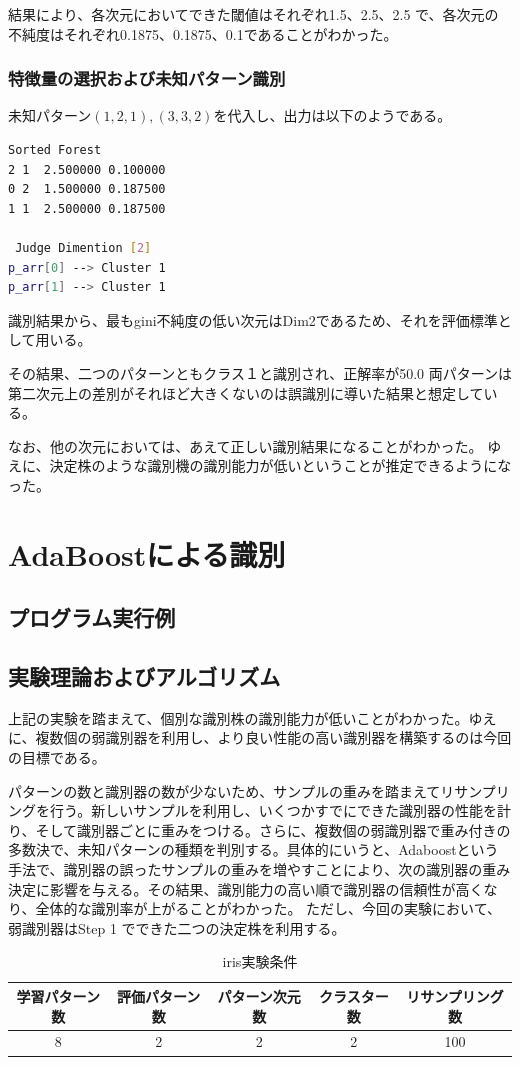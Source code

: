 \documentclass[ %
  uplatex,%
  papersize%
]{jsarticle}
\begin{document}
結果により、各次元においてできた閾値はそれぞれ1.5、2.5、2.5 で、各次元の不純度はそれぞれ0.1875、0.1875、0.1であることがわかった。

\subsubsection{特徴量の選択および未知パターン識別}
未知パターン$(1, 2, 1),(3, 3, 2)$を代入し、出力は以下のようである。

\begin{lstlisting}[language=bash,caption=Recognition]
Sorted Forest
2 1  2.500000 0.100000
0 2  1.500000 0.187500
1 1  2.500000 0.187500

 Judge Dimention [2]
p_arr[0] --> Cluster 1
p_arr[1] --> Cluster 1
\end{lstlisting}

識別結果から、最もgini不純度の低い次元はDim2であるため、それを評価標準として用いる。

その結果、二つのパターンともクラス１と識別され、正解率が50.0%
両パターンは第二次元上の差別がそれほど大きくないのは誤識別に導いた結果と想定している。

なお、他の次元においては、あえて正しい識別結果になることがわかった。
ゆえに、決定株のような識別機の識別能力が低いということが推定できるようになった。

\section{AdaBoostによる識別}

\subsection{プログラム実行例}

\subsection{実験理論およびアルゴリズム}

上記の実験を踏まえて、個別な識別株の識別能力が低いことがわかった。ゆえに、複数個の弱識別器を利用し、より良い性能の高い識別器を構築するのは今回の目標である。

パターンの数と識別器の数が少ないため、サンプルの重みを踏まえてリサンプリングを行う。新しいサンプルを利用し、いくつかすでにできた識別器の性能を計り、そして識別器ごとに重みをつける。さらに、複数個の弱識別器で重み付きの多数決で、未知パターンの種類を判別する。具体的にいうと、Adaboostという手法で、識別器の誤ったサンプルの重みを増やすことにより、次の識別器の重み決定に影響を与える。その結果、識別能力の高い順で識別器の信頼性が高くなり、全体的な識別率が上がることがわかった。
ただし、今回の実験において、弱識別器はStep 1 でできた二つの決定株を利用する。
\begin{table}[h]\footnotesize
\caption{iris実験条件}
\label{}
\centering
\begin{tabular}{|c|c|c|c|c|}
\hline
学習パターン数&評価パターン数&パターン次元数&クラスター数&リサンプリング数\\
\hline
8&2&2&2&100\\
\hline
\end{tabular} 
\end{table}
\end{document}
